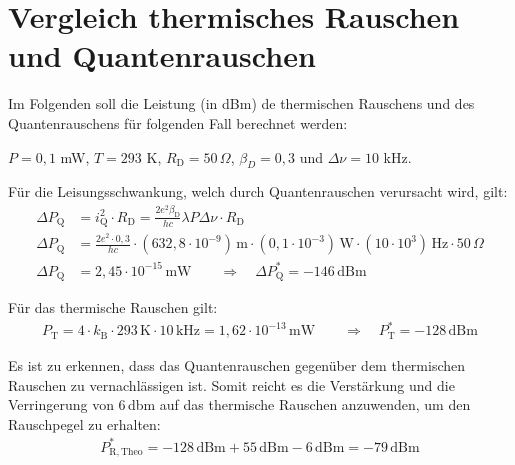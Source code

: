 
\section{Vergleich thermisches Rauschen und Quantenrauschen}

Im Folgenden soll die Leistung (in dBm) de thermischen Rauschens und des Quantenrauschens für folgenden Fall berechnet werden:

$P = 0,1$ mW, $T = 293$ K, $R_\mathrm{D} = 50\, \Omega$, $\beta_D = 0,3$ und $\Delta \nu = 10$ kHz.

Für die Leisungsschwankung, welch durch Quantenrauschen verursacht wird, gilt:
\begin{align}
    \Delta P_\mathrm{Q} &= i^2_\mathrm{Q} \cdot R_\mathrm{D} = \frac{2e^2\beta_\mathrm{D}}{hc}\lambda P \Delta \nu \cdot R_\mathrm{D}\\
    \Delta P_\mathrm{Q} &= \frac{2e^2 \cdot 0,3}{hc} \cdot (632,8 \cdot 10^{-9}) \, \mathrm{m} \cdot (0,1 \cdot 10^{-3})\, \mathrm{W} \cdot (10 \cdot 10^3) \, \mathrm{Hz} \cdot 50 \, \Omega \\
    \Delta P_\mathrm{Q} &= 2,45 \cdot 10^{-15}\,\mathrm{mW} \qquad \Rightarrow \quad \Delta P_\mathrm{Q}^* = -146 \, \mathrm{dBm}
\end{align}

Für das thermische Rauschen gilt:
\begin{gather}
    P_\mathrm{T} = 4 \cdot k_\mathrm{B} \cdot 293\,\text{K} \cdot 10\,\text{kHz} = 1,62 \cdot 10^{-13}\, \text{mW} \qquad \Rightarrow \quad P_\mathrm{T}^* = -128 \, \text{dBm}
\end{gather}

Es ist zu erkennen, dass das Quantenrauschen gegenüber dem thermischen Rauschen zu vernachlässigen ist.
Somit reicht es die Verstärkung und die Verringerung von 6\,dbm \cite{anleitung} auf das thermische Rauschen anzuwenden, um den Rauschpegel zu erhalten:
\begin{gather}
    P_\mathrm{R,Theo}^* = -128 \, \text{dBm} + 55\, \text{dBm} - 6 \, \text{dBm}= -79 \, \text{dBm}
\end{gather}